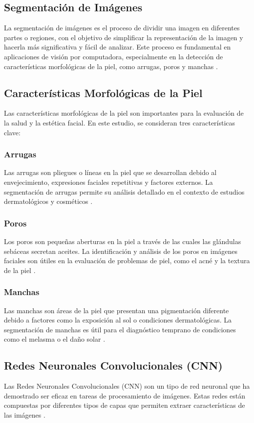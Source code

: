 \subsection{Segmentación de Imágenes}
La segmentación de imágenes es el proceso de dividir una imagen en diferentes partes o regiones, con el objetivo de simplificar la representación de la imagen y hacerla más significativa y fácil de analizar. Este proceso es fundamental en aplicaciones de visión por computadora, especialmente en la detección de características morfológicas de la piel, como arrugas, poros y manchas \cite{autor2020segmentacion}.

\subsection{Características Morfológicas de la Piel}
Las características morfológicas de la piel son importantes para la evaluación de la salud y la estética facial. En este estudio, se consideran tres características clave:

\subsubsection{Arrugas}
Las arrugas son pliegues o líneas en la piel que se desarrollan debido al envejecimiento, expresiones faciales repetitivas y factores externos. La segmentación de arrugas permite su análisis detallado en el contexto de estudios dermatológicos y cosméticos \cite{autor2021arrugas}.

\subsubsection{Poros}
Los poros son pequeñas aberturas en la piel a través de las cuales las glándulas sebáceas secretan aceites. La identificación y análisis de los poros en imágenes faciales son útiles en la evaluación de problemas de piel, como el acné y la textura de la piel \cite{autor2020poros}.

\subsubsection{Manchas}
Las manchas son áreas de la piel que presentan una pigmentación diferente debido a factores como la exposición al sol o condiciones dermatológicas. La segmentación de manchas es útil para el diagnóstico temprano de condiciones como el melasma o el daño solar \cite{autor2019manchas}.

\subsection{Redes Neuronales Convolucionales (CNN)}
Las Redes Neuronales Convolucionales (CNN) son un tipo de red neuronal que ha demostrado ser eficaz en tareas de procesamiento de imágenes. Estas redes están compuestas por diferentes tipos de capas que permiten extraer características de las imágenes \cite{autor2022cnn}.

